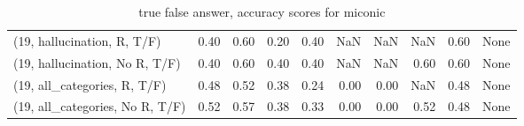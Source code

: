 \begin{table*}[h!]
\begin{adjustbox}{width=2\columnwidth,center}
\begin{tabular}{lrrr|rrr|rrr}
(19, hallucination, R, T/F)           &                      0.40 &                  0.60 &                      0.20 &                          0.40 &                       NaN &                           NaN &                                    NaN &                               0.60 &                                  None \\
(19, hallucination, No R, T/F)        &                      0.40 &                  0.60 &                      0.40 &                          0.40 &                       NaN &                           NaN &                                   0.60 &                               0.60 &                                  None \\
(19, all\_categories, R, T/F)          &                      0.48 &                  0.52 &                      0.38 &                          0.24 &                      0.00 &                          0.00 &                                    NaN &                               0.48 &                                  None \\
(19, all\_categories, No R, T/F)       &                      0.52 &                  0.57 &                      0.38 &                          0.33 &                      0.00 &                          0.00 &                                   0.52 &                               0.48 &                                  None \\


\bottomrule
\end{tabular}
\end{adjustbox}
\caption{true false answer, accuracy scores for miconic}
\end{table*}
